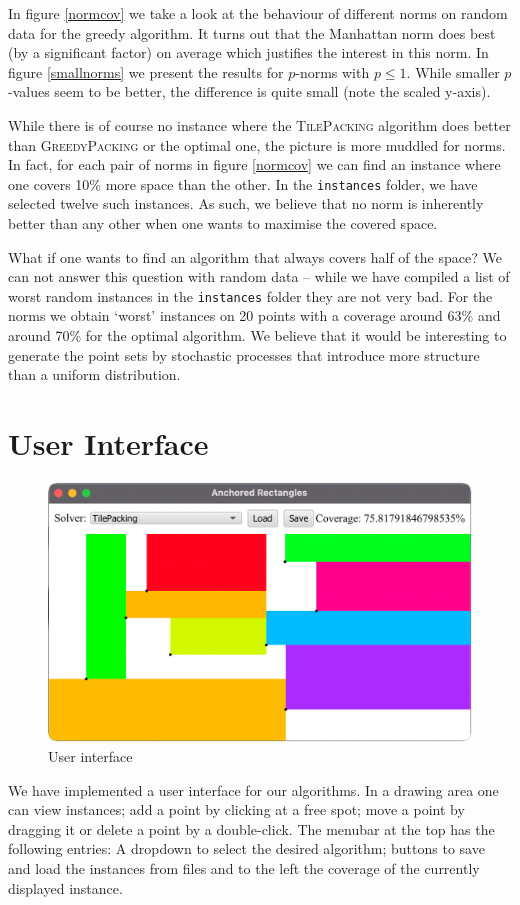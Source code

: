 \documentclass[11pt, a4paper, twocolumn]{article}
\begin{document}
In figure \ref{normcov} we take a look at the behaviour of different norms on random data
for the greedy algorithm. It turns out that the Manhattan norm does best (by a significant factor)
on average which justifies the interest in this norm. In figure \ref{smallnorms} we present
the results for $p$-norms with $p \leq 1$. While smaller $p$-values seem to be better, the
difference is quite small (note the scaled y-axis).

While there is of course no instance where the \textsc{TilePacking} algorithm does better
than \textsc{GreedyPacking} or the optimal one, the picture is more muddled for norms.
In fact, for each pair of norms in figure \ref{normcov} we can find an instance
where one covers 10\% more space than the other.
In the \texttt{instances} folder, we have selected twelve such instances.
As such, we believe that
no norm is inherently better than any other when one wants to maximise the covered space.

What if one wants to find an algorithm that always covers half of the space?
We can not answer this question with random data -- while we have compiled
a list of worst random instances in the \texttt{instances} folder they are
not very bad. For the norms we obtain `worst' instances on 20 points
with a coverage around 63\% and around 70\% for the optimal algorithm.
We believe that it would be interesting to generate the point sets by
stochastic processes that introduce more structure than a uniform distribution.

\section{User Interface} \label{userinterface}

\begin{figure}
\includegraphics[width=\textwidth]{ui.png}
\caption{User interface}
\label{ui}
\end{figure}

We have implemented a user interface for our algorithms.
In a drawing area one can view instances; add a point by clicking
at a free spot; move a point by dragging it or delete a point
by a double-click. The menubar at the top has the following entries: A dropdown
to select the desired algorithm; buttons to save and load the instances
from files and to the left the coverage of the currently displayed instance. 

\printbibliography
\end{document}
